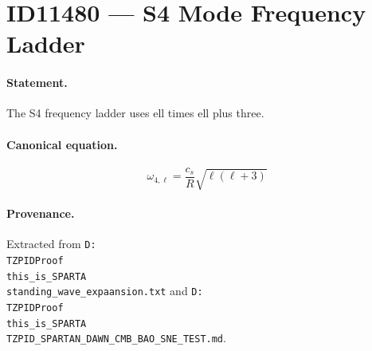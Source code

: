 \section*{ID11480 --- S4 Mode Frequency Ladder}

\paragraph{Statement.}
The S4 frequency ladder uses ell times ell plus three.

\paragraph{Canonical equation.}
\[
\omega_{4,\ell}=\frac{c_s}{R}\sqrt{\ell(\ell+3)}
\]

\paragraph{Provenance.}
Extracted from \texttt{D:\\TZPIDProof\\this\_is\_SPARTA\\standing\_wave\_expaansion.txt} and \texttt{D:\\TZPIDProof\\this\_is\_SPARTA\\TZPID\_SPARTAN\_DAWN\_CMB\_BAO\_SNE\_TEST.md}.
